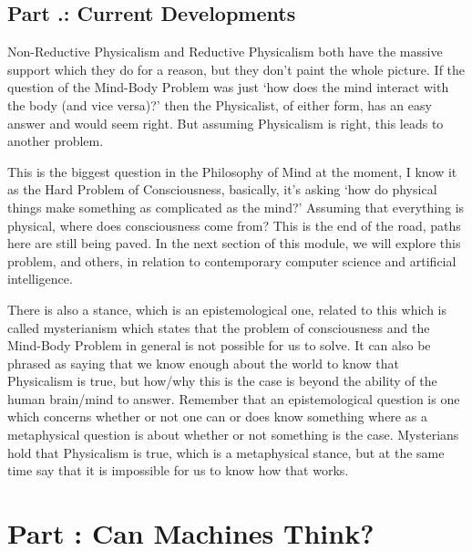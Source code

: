 \section{Part \thechapcount.\theseccount: Current Developments}
Non-Reductive Physicalism and Reductive Physicalism both have the massive support which they do for a reason, but they don't paint the whole picture. If the question of the Mind-Body Problem was just ‘how does the mind interact with the body (and vice versa)?' then the Physicalist, of either form, has an easy answer and would seem right. But assuming Physicalism is right, this leads to another problem. 


This is the biggest question in the Philosophy of Mind at the moment, I know it as the Hard Problem of Consciousness, basically, it's asking `how do physical things make something as complicated as the mind?' Assuming that everything is physical, where does consciousness come from? This is the end of the road, paths here are still being paved. In the next section of this module, we will explore this problem, and others, in relation to contemporary computer science and artificial intelligence.

There is also a stance, which is an epistemological one, related to this which is called mysterianism which states that the problem of consciousness and the Mind-Body Problem in general is not possible for us to solve. It can also be phrased as saying that we know enough about the world to know that Physicalism is true, but how/why this is the case is beyond the ability of the human brain/mind to answer. Remember that an epistemological question is one which concerns whether or not one can or does know something where as a metaphysical question is about whether or not something is the case. Mysterians hold that Physicalism is true, which is a metaphysical stance, but at the same time say that it is impossible for us to know how that works.


\chapter{Part \thechapcount: Can Machines Think?}\setcounter{seccount}{1}

